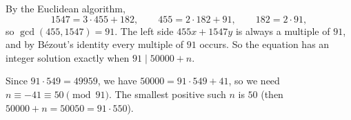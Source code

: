 By the Euclidean algorithm,
\[1547=3\cdot455+182,\qquad455=2\cdot182+91,\qquad182=2\cdot91,\]
so $\gcd(455,1547)=91$. The left side $455x+1547y$ is always a multiple of $91$, and by B\'ezout's identity every multiple of $91$ occurs. So the equation has an integer solution exactly when $91\mid50000+n$.

Since $91\cdot549=49959$, we have $50000=91\cdot549+41$, so we need $n\equiv-41\equiv50\pmod{91}$. The smallest positive such $n$ is $\boxed{50}$ (then $50000+n=50050=91\cdot550$).
